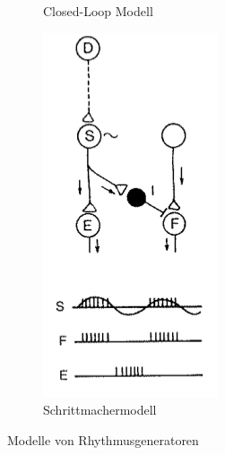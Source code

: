 \begin{figure}[h!]
\begin{subfigure}{.2\textwidth}
		\caption{Closed-Loop Modell}
		\label{CL}
	\end{subfigure}
	\begin{subfigure}{.2\textwidth}
		\includegraphics[width=\textwidth]{figures/ch05_Schrittmacher.png}
		\caption{Schrittmachermodell}
		\label{SM}
	\end{subfigure}
	\caption{Modelle von Rhythmusgeneratoren}
\end{figure}
